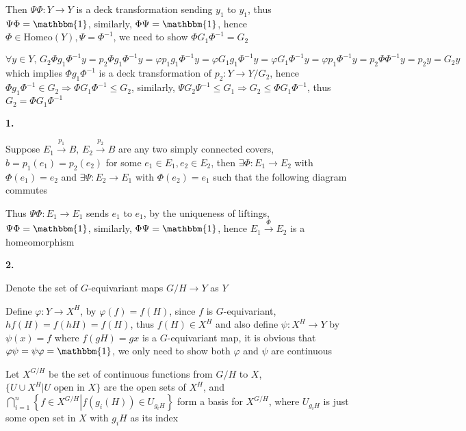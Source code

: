 \documentclass[../main.tex]{subfiles}
\begin{document}
Then $\Psi\Phi:Y\rightarrow Y$ is a deck transformation sending $y_1$ to $y_1$, thus $\Psi\Phi=\mathbbm{1}$, similarly, $\Phi\Psi=\mathbbm{1}$, hence $\Phi\in\mathrm{Homeo}(Y), \Psi=\Phi^{-1}$, we need to show $\Phi G_1\Phi^{-1}=G_2$ \par
$\forall y\in Y, \, G_2\Phi g_1\Phi^{-1}y=p_2\Phi g_1\Phi^{-1}y=\varphi p_1g_1\Phi^{-1}y=\varphi G_1g_1\Phi^{-1}y=\varphi G_1\Phi^{-1}y=\varphi p_1\Phi^{-1}y=p_2\Phi\Phi^{-1}y=p_2y=G_2y$ which implies $\Phi g_1\Phi^{-1}$ is a deck transformation of $p_2:Y\rightarrow Y/G_2$, hence $\Phi g_1\Phi^{-1}\in G_2 \Rightarrow \Phi G_1\Phi^{-1}\leq G_2$, similarly, $\Psi G_2\Psi^{-1}\leq G_1 \Rightarrow G_2 \leq\Phi G_1\Phi^{-1}$, thus $G_2 =\Phi G_1\Phi^{-1}$ \par
\textbf{1.} \par
Suppose $E_1\overset{p_1}{\rightarrow}B,\,E_2\overset{p_2}{\rightarrow}B$ are any two simply connected covers, $b=p_1(e_1)=p_2(e_2)$ for some $e_1\in E_1,e_2\in E_2$, then $\exists \Phi:E_1\rightarrow E_2$ with $\Phi(e_1)=e_2$ and $\exists \Psi:E_2\rightarrow E_1$ with $\Phi(e_2)=e_1$ such that the following diagram commutes \par
\begin{center}
\end{center}
Thus $\Psi\Phi:E_1\rightarrow E_1$ sends $e_1$ to $e_1$, by the uniqueness of liftings, $\Psi\Phi=\mathbbm{1}$, similarly, $\Phi\Psi=\mathbbm{1}$, hence $E_1\overset{\Phi}{\rightarrow}E_2$ is a homeomorphism \par
\textbf{2.} \par
Denote the set of $G$-equivariant maps $G/H\rightarrow Y$ as $Y$ \par
Define $\varphi:Y\rightarrow X^H$, by $\varphi(f)=f(H)$, since $f$ is $G$-equivariant, $hf(H)=f(hH)=f(H)$, thus $f(H)\in X^H$ and also define $\psi:X^H\rightarrow Y$ by $\psi(x)=f$ where $f(gH)=gx$ is a $G$-equivariant map, it is obvious that $\varphi\psi=\psi\varphi=\mathbbm{1}$, we only need to show both $\varphi$ and $\psi$ are continuous \par
Let $X^{G/H}$ be the set of continuous functions from $G/H$ to $X$, $\{U\cup X^H\left|U \text{ open in } X\right.\}$ are the open sets of $X^H$, and $\displaystyle\bigcap_{i=1}^n\left\{f\in X^{G/H}\left|f(g_i(H))\in U_{g_iH}\right.\right\}$ form a basis for $X^{G/H}$, where $U_{g_iH}$ is just some open set in $X$ with $g_iH$ as its index \par
\end{document}
